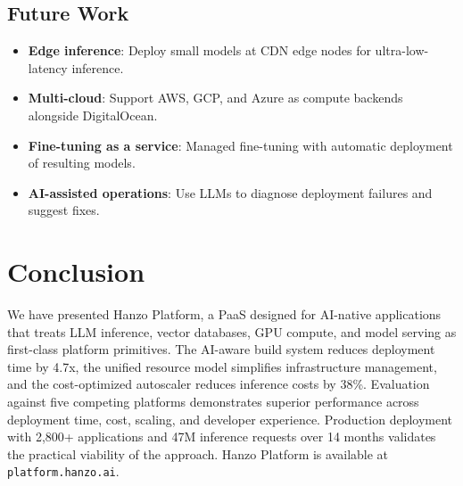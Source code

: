 \documentclass[11pt,twocolumn]{article}
\begin{document}
\subsection{Future Work}

\begin{itemize}[leftmargin=1.1em]
    \item \textbf{Edge inference}: Deploy small models at CDN edge nodes for ultra-low-latency inference.
    \item \textbf{Multi-cloud}: Support AWS, GCP, and Azure as compute backends alongside DigitalOcean.
    \item \textbf{Fine-tuning as a service}: Managed fine-tuning with automatic deployment of resulting models.
    \item \textbf{AI-assisted operations}: Use LLMs to diagnose deployment failures and suggest fixes.
\end{itemize}

\section{Conclusion}
\label{sec:conclusion}

We have presented Hanzo Platform, a PaaS designed for AI-native applications that treats LLM inference, vector databases, GPU compute, and model serving as first-class platform primitives. The AI-aware build system reduces deployment time by 4.7x, the unified resource model simplifies infrastructure management, and the cost-optimized autoscaler reduces inference costs by 38\%. Evaluation against five competing platforms demonstrates superior performance across deployment time, cost, scaling, and developer experience. Production deployment with 2,800+ applications and 47M inference requests over 14 months validates the practical viability of the approach. Hanzo Platform is available at \texttt{platform.hanzo.ai}.
\end{document}

